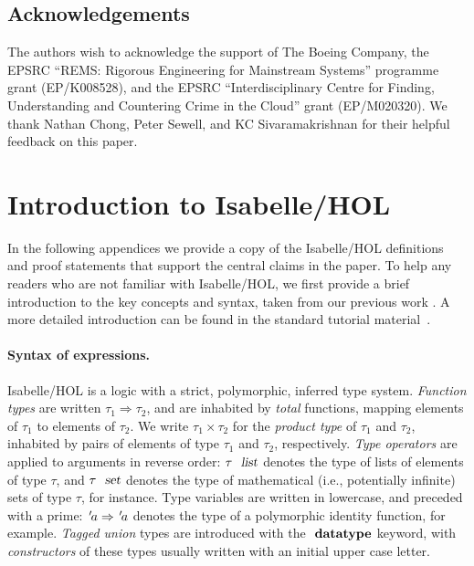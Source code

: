 \documentclass[11pt]{article}
\begin{document}
\subsection*{Acknowledgements}

The authors wish to acknowledge the support of The Boeing Company,
the EPSRC ``REMS: Rigorous Engineering for Mainstream Systems'' programme grant (EP/K008528), and
the EPSRC ``Interdisciplinary Centre for Finding, Understanding and Countering Crime in the Cloud'' grant (EP/M020320).
We thank Nathan Chong, Peter Sewell, and KC Sivaramakrishnan for their helpful feedback on this paper.

\newpage


{}

\newpage

\appendix

\section{Introduction to Isabelle/HOL}
\label{sect:appendix:isabelle}

In the following appendices we provide a copy of the Isabelle/HOL definitions and proof statements that support the central claims in the paper.
To help any readers who are not familiar with Isabelle/HOL, we first provide a brief introduction to the key concepts and syntax, taken from our previous work \cite{Gomes:2017gy}.
A more detailed introduction can be found in the standard tutorial material~\cite{DBLP:books/sp/NipkowK14}.

\paragraph{Syntax of expressions.}

Isabelle/HOL is a logic with a strict, polymorphic, inferred type system.
\emph{Function types} are written $\tau_1 \Rightarrow \tau_2$, and are inhabited by \emph{total} functions, mapping elements of $\tau_1$ to elements of $\tau_2$.
We write $\tau_1 \times \tau_2$ for the \emph{product type} of $\tau_1$ and $\tau_2$, inhabited by pairs of elements of type $\tau_1$ and $\tau_2$, respectively.
\emph{Type operators} are applied to arguments in reverse order: $\tau\ \isa{list}$ denotes the type of lists of elements of type $\tau$, and $\tau\ \isa{set}$ denotes the type of mathematical (i.e., potentially infinite) sets of type $\tau$, for instance.
Type variables are written in lowercase, and preceded with a prime: ${\emph{$\mskip2mu{'}\mskip-2mu$}}a \Rightarrow {\emph{$\mskip2mu{'}\mskip-2mu$}}a$ denotes the type of a polymorphic identity function, for example.
\emph{Tagged union} types are introduced with the $\isacommand{datatype}$ keyword, with \emph{constructors} of these types usually written with an initial upper case letter.
\end{document}

